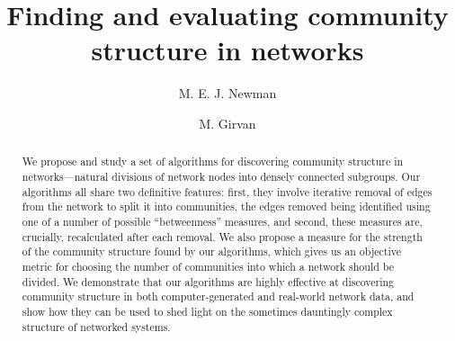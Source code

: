 \documentclass[twocolumn,pre,superscriptaddress]{revtex4}
\begin{document}
\renewcommand{\d}{\mathrm{d}}
\renewcommand{\O}{\mathrm{O}}
\newcommand{\e}{\mathrm{e}}
\newcommand{\half}{\mbox{$\frac12$}}
\newcommand{\set}[1]{\lbrace#1\rbrace}
\newcommand{\av}[1]{\langle#1\rangle}
\newcommand{\eref}[1]{(\ref{#1})}
\newcommand{\etal}{{\it{}et~al.}}
\newcommand{\defn}{\textit}
\newcommand{\from}{\leftarrow}
\newcommand{\ve}{\mathbf{e}}
\newcommand{\vI}{\mathbf{I}}
\newcommand{\vM}{\mathbf{M}}
\newcommand{\vV}{\mathbf{V}}
\newcommand{\vD}{\mathbf{D}}
\newcommand{\vA}{\mathbf{A}}
\newcommand{\vT}{\mathbf{T}}
\newcommand{\vS}{\mathbf{S}}
\newcommand{\vs}{\mathbf{s}}
\newcommand{\vX}{\mathbf{X}}
\newcommand{\vx}{\mathbf{x}}
\newcommand{\vone}{\mathbf{1}}
\newcommand{\Tr}{\mathop{\rm Tr}}
\newcommand{\norm}[1]{\left\|\,#1\,\right\|}

\newlength{\figurewidth}
\ifdim\columnwidth<10.5cm
  \setlength{\figurewidth}{0.95\columnwidth}
\else
  \setlength{\figurewidth}{10cm}
\fi
\setlength{\parskip}{0pt}
\setlength{\tabcolsep}{6pt}
\setlength{\arraycolsep}{2pt}


\title{Finding and evaluating community structure in networks}
\author{M. E. J. Newman}
\author{M. Girvan}

\begin{abstract}
We propose and study a set of algorithms for discovering community
structure in networks---natural divisions of network nodes into densely
connected subgroups.  Our algorithms all share two definitive features:
first, they involve iterative removal of edges from the network to split it
into communities, the edges removed being identified using one of a number
of possible ``betweenness'' measures, and second, these measures are,
crucially, recalculated after each removal.  We also propose a measure for
the strength of the community structure found by our algorithms, which
gives us an objective metric for choosing the number of communities into
which a network should be divided.  We demonstrate that our algorithms are
highly effective at discovering community structure in both
computer-generated and real-world network data, and show how they can be
used to shed light on the sometimes dauntingly complex structure of
networked systems.
\end{abstract}
\pacs{}
\maketitle
\end{document}
